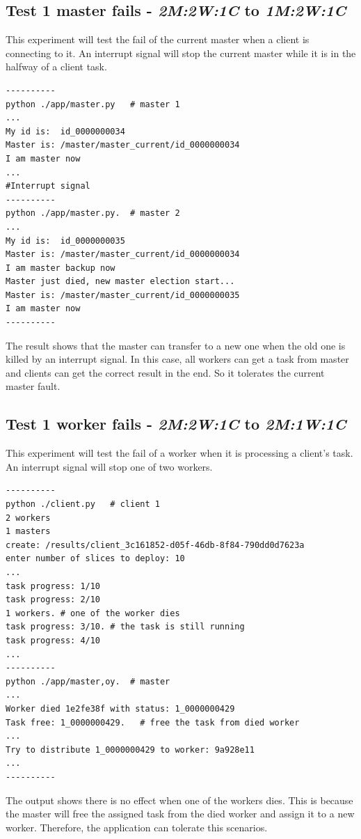 \documentclass[runningheads,a4paper]{llncs}
\begin{document}
\subsection{Test 1 master fails - \emph{2M:2W:1C} to \emph{1M:2W:1C}}
This experiment will test the fail of the current master when a client is connecting to it.  An interrupt signal will stop the current master while it is in the halfway of a client task.
\begin{verbatim}
----------
python ./app/master.py   # master 1
...
My id is:  id_0000000034
Master is: /master/master_current/id_0000000034
I am master now
...
#Interrupt signal
----------
python ./app/master.py.  # master 2
...
My id is:  id_0000000035
Master is: /master/master_current/id_0000000034
I am master backup now
Master just died, new master election start...
Master is: /master/master_current/id_0000000035
I am master now
----------
\end{verbatim}

The result shows that the master can transfer to a new one when the old one is killed by an interrupt signal. In this case, all workers can get a task from master and clients can get the correct result in the end. So it tolerates the current master fault.

\subsection{Test 1 worker fails - \emph{2M:2W:1C} to \emph{2M:1W:1C}}

This experiment will test the fail of a worker when it is processing a client's task.  An interrupt signal will stop one of two workers.

\begin{verbatim}
----------
python ./client.py   # client 1
2 workers
1 masters
create: /results/client_3c161852-d05f-46db-8f84-790dd0d7623a
enter number of slices to deploy: 10
...
task progress: 1/10
task progress: 2/10
1 workers. # one of the worker dies
task progress: 3/10. # the task is still running
task progress: 4/10
...
----------
python ./app/master,oy.  # master
...
Worker died 1e2fe38f with status: 1_0000000429 
Task free: 1_0000000429.   # free the task from died worker
...
Try to distribute 1_0000000429 to worker: 9a928e11 
...
----------
\end{verbatim}

The output shows there is no effect when one of the workers dies. This is because the master will free the assigned task from the died worker and assign it to a new worker. Therefore, the application can tolerate this scenarios.
\end{document}
